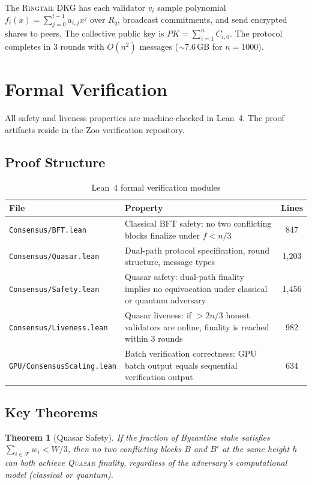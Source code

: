 \documentclass[11pt,letterpaper]{article}
\newtheorem{theorem}{Theorem}
\theoremstyle{definition}
\theoremstyle{remark}
\newcommand{\Quasar}{\textsc{Quasar}}
\newcommand{\Ringtail}{\textsc{Ringtail}}
\begin{document}
The \Ringtail{} DKG has each validator $v_i$ sample polynomial $f_i(x) = \sum_{j=0}^{t-1} a_{i,j} x^j$ over $R_q$, broadcast commitments, and send encrypted shares to peers. The collective public key is $PK = \sum_{i=1}^{n} C_{i,0}$. The protocol completes in 3 rounds with $O(n^2)$ messages ($\sim$7.6\,GB for $n = 1000$).

\section{Formal Verification}

All safety and liveness properties are machine-checked in Lean~4. The proof artifacts reside in the Zoo verification repository.

\subsection{Proof Structure}

\begin{table}[h]
\centering
\begin{tabular}{lp{7cm}c}
\toprule
\textbf{File} & \textbf{Property} & \textbf{Lines} \\
\midrule
\texttt{Consensus/BFT.lean} & Classical BFT safety: no two conflicting blocks finalize under $f < n/3$ & 847 \\
\texttt{Consensus/Quasar.lean} & Dual-path protocol specification, round structure, message types & 1,203 \\
\texttt{Consensus/Safety.lean} & Quasar safety: dual-path finality implies no equivocation under classical or quantum adversary & 1,456 \\
\texttt{Consensus/Liveness.lean} & Quasar liveness: if $> 2n/3$ honest validators are online, finality is reached within 3 rounds & 982 \\
\texttt{GPU/ConsensusScaling.lean} & Batch verification correctness: GPU batch output equals sequential verification output & 634 \\
\bottomrule
\end{tabular}
\caption{Lean~4 formal verification modules}
\label{tab:lean-proofs}
\end{table}

\subsection{Key Theorems}

\begin{theorem}[Quasar Safety]
\label{thm:safety}
If the fraction of Byzantine stake satisfies $\sum_{i \in \mathcal{F}} w_i < W/3$, then no two conflicting blocks $B$ and $B'$ at the same height $h$ can both achieve \Quasar{} finality, regardless of the adversary's computational model (classical or quantum).
\end{theorem}
\end{document}
